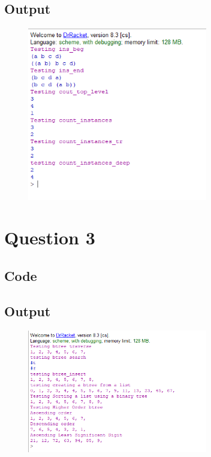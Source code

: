 \documentclass{article}
\begin{document}
		\subsection{Output}
			\begin{figure}[h!]
				\centering
				\includegraphics[width=0.7\textwidth]{2}
			\end{figure}
		\newpage
	\section{Question 3}
		\subsection{Code}
		\subsection{Output}
			\begin{figure}[h!]
				\centering
				\includegraphics[width=0.7\textwidth]{3}
			\end{figure}
	
	
\end{document}
